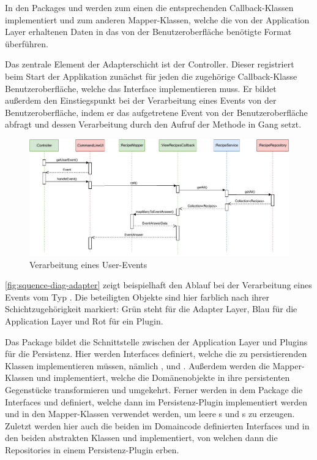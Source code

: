 In den Packages  und  werden zum einen die entsprechenden Callback-Klassen implementiert und zum anderen Mapper-Klassen, welche die von der Application Layer erhaltenen Daten in das von der Benutzeroberfläche benötigte Format überführen.

Das zentrale Element der Adapterschicht ist der Controller. Dieser registriert beim Start der Applikation zunächst für jeden  die zugehörige Callback-Klasse Benutzeroberfläche, welche das Interface  implementieren muss. Er bildet außerdem den Einstiegspunkt bei der Verarbeitung eines Events von der Benutzeroberfläche, indem er das aufgetretene Event von der Benutzeroberfläche abfragt und dessen Verarbeitung durch den Aufruf der Methode  in Gang setzt. 

\begin{figure}[ht!]
    \includegraphics[width=0.98\columnwidth]{../diagrams/adapter_sequence.pdf}
    \caption{Verarbeitung eines User-Events}
    \label{fig:squence-diag-adapter}
\end{figure}

\autoref{fig:squence-diag-adapter} zeigt beispielhaft den Ablauf bei der Verarbeitung eines Events vom Typ . Die beteiligten Objekte sind hier farblich nach ihrer Schichtzugehörigkeit markiert: Grün steht für die Adapter Layer, Blau für die Application Layer und Rot für ein Plugin.

Das Package  bildet die Schnittstelle zwischen der Application Layer und Plugins für die Persistenz. Hier werden Interfaces definiert, welche die zu persistierenden Klassen implementieren müssen, nämlich ,  und . Außerdem werden die Mapper-Klassen  und  implementiert, welche die Domänenobjekte in ihre persistenten Gegenstücke transformieren und umgekehrt. Ferner werden in dem Package die Interfaces  und  definiert, welche dann im Persistenz-Plugin implementiert werden und in den Mapper-Klassen verwendet werden, um leere s und s zu erzeugen. Zuletzt werden hier auch die beiden im Domaincode definierten Interfaces  und  in den beiden abstrakten Klassen  und  implementiert, von welchen dann die Repositories in einem Persistenz-Plugin erben.


